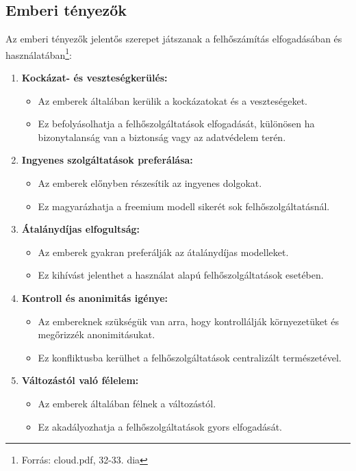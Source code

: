 \documentclass[a4paper,12pt]{article}
\begin{document}
    \subsection{Emberi tényezők}

    Az emberi tényezők jelentős szerepet játszanak a felhőszámítás elfogadásában és használatában\footnote{Forrás: cloud.pdf, 32-33. dia}:

    \begin{enumerate}
        \item \textbf{Kockázat- és veszteségkerülés:}
        \begin{itemize}
            \item Az emberek általában kerülik a kockázatokat és a veszteségeket.
            \item Ez befolyásolhatja a felhőszolgáltatások elfogadását, különösen ha bizonytalanság van a biztonság vagy az adatvédelem terén.
        \end{itemize}

        \item \textbf{Ingyenes szolgáltatások preferálása:}
        \begin{itemize}
            \item Az emberek előnyben részesítik az ingyenes dolgokat.
            \item Ez magyarázhatja a freemium modell sikerét sok felhőszolgáltatásnál.
        \end{itemize}

        \item \textbf{Átalánydíjas elfogultság:}
        \begin{itemize}
            \item Az emberek gyakran preferálják az átalánydíjas modelleket.
            \item Ez kihívást jelenthet a használat alapú felhőszolgáltatások esetében.
        \end{itemize}

        \item \textbf{Kontroll és anonimitás igénye:}
        \begin{itemize}
            \item Az embereknek szükségük van arra, hogy kontrollálják környezetüket és megőrizzék anonimitásukat.
            \item Ez konfliktusba kerülhet a felhőszolgáltatások centralizált természetével.
        \end{itemize}

        \item \textbf{Változástól való félelem:}
        \begin{itemize}
            \item Az emberek általában félnek a változástól.
            \item Ez akadályozhatja a felhőszolgáltatások gyors elfogadását.
        \end{itemize}


\end{enumerate}
\end{document}
